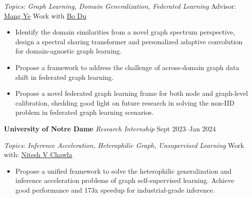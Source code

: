 \textit{Topics: Graph Learning, Domain Generalization, Federated Learning} \hfill Advisor: \href{https://scholar.google.com/citations?user=j-HxRy0AAAAJ&hl=en}{Mang Ye}  Work with  \href{https://scholar.google.com/citations?user=Shy1gnMAAAAJ&hl=en}{Bo Du}\par 
\begin{itemize}
        \item Identify the domain similarities from a novel graph spectrum perspective,  design a spectral sharing transformer and personalized adaptive convolution for domain-agnostic graph learning.
	\item Propose a framework to address the challenge of across-domain graph data shift in federated graph learning. 
	\item Propose a novel federated graph learning frame for both node and graph-level calibration, shedding good light on future research in solving the non-IID problem in federated graph learning scenarios.
\end{itemize}\par



\textbf{University of Notre Dame} \textit{Research Internship} \hfill Sept 2023--Jan 2024\par  

\textit{Topics: Inference Acceleration, Heterophilic Graph, Unsupervised Learning} \hfill Work with:  \href{https://scholar.google.com/citations?user=hDLBEhkAAAAJ}{Nitesh V Chawla}\par
\begin{itemize}
        \item Propose a unified framework to solve the heterophilic generalization and inference acceleration problems of graph self-supervised learning. Achieve good performance and 173x speedup for industrial-grade inference.
\end{itemize}\par





